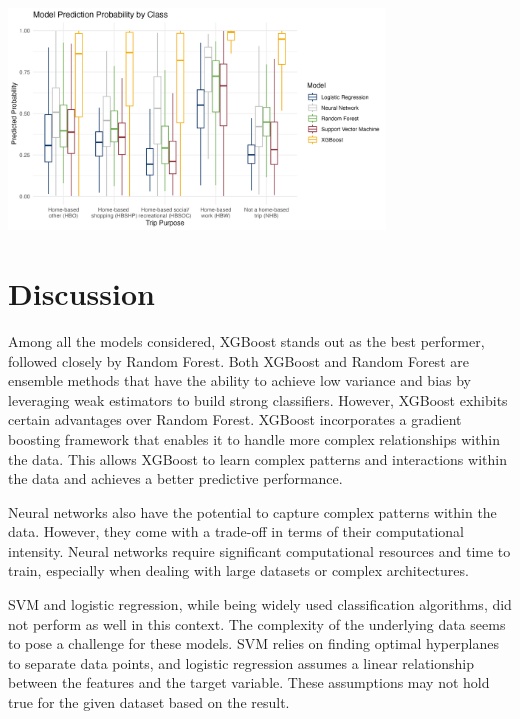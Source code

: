 \documentclass[
  article,
  nofooter]{jss}
\begin{document}
\begin{center}
\includegraphics[width=0.75\textwidth,height=\textheight]{imgs/model-prediction-certainty-by-class.png}
\end{center}

\section{Discussion}\label{discussion}

Among all the models considered, XGBoost stands out as the best
performer, followed closely by Random Forest. Both XGBoost and Random
Forest are ensemble methods that have the ability to achieve low
variance and bias by leveraging weak estimators to build strong
classifiers. However, XGBoost exhibits certain advantages over Random
Forest. XGBoost incorporates a gradient boosting framework that enables
it to handle more complex relationships within the data. This allows
XGBoost to learn complex patterns and interactions within the data and
achieves a better predictive performance.

Neural networks also have the potential to capture complex patterns
within the data. However, they come with a trade-off in terms of their
computational intensity. Neural networks require significant
computational resources and time to train, especially when dealing with
large datasets or complex architectures.

SVM and logistic regression, while being widely used classification
algorithms, did not perform as well in this context. The complexity of
the underlying data seems to pose a challenge for these models. SVM
relies on finding optimal hyperplanes to separate data points, and
logistic regression assumes a linear relationship between the features
and the target variable. These assumptions may not hold true for the
given dataset based on the result.
\end{document}

